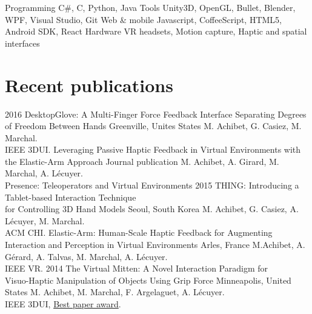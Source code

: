 \documentclass[]{friggeri-cv}
\begin{document}
\begin{entrylist}
	\entry
		{Programming}
		{C\#, C, Python, Java}
		{}
		{}
	\entry
		{Tools}
		{Unity3D, OpenGL, Bullet, Blender, WPF, Visual Studio, Git}
		{}
		{}
	\entry
		{Web \& mobile}
		{Javascript, CoffeeScript, HTML5, Android SDK, React}
		{}
		{}
	\entry
		{Hardware}
		{VR headsets, Motion capture, Haptic and spatial interfaces}
		{}
		{}
\end{entrylist}

\section{Recent publications}

\begin{entrylist}
  \entry
    {2016}
    {DesktopGlove: A Multi-Finger Force Feedback Interface Separating Degrees of Freedom Between Hands}
    {Greenville, Unites States}
    {M. Achibet, G. Casiez, M. Marchal.\\ IEEE 3DUI.}
  \entry
    {}
    {Leveraging Passive Haptic Feedback in Virtual Environments with the Elastic-Arm Approach}
    {Journal publication}
    {M. Achibet, A. Girard, M. Marchal, A. Lécuyer.\\Presence: Teleoperators and Virtual Environments}
  \entry
    {2015}
    {THING: Introducing a Tablet-based Interaction Technique\\ for Controlling 3D Hand Models}
    {Seoul, South Korea}
    {M. Achibet, G. Casiez, A. Lécuyer, M. Marchal.\\ACM CHI.}
  \entry
    {}
    {Elastic-Arm: Human-Scale Haptic Feedback for Augmenting\\ Interaction and Perception in Virtual Environments}
    {Arles, France}
    {M.Achibet, A. Gérard, A. Talvas, M. Marchal, A. Lécuyer.\\IEEE VR.}
  \entry
    {2014}
    {The Virtual Mitten: A Novel Interaction Paradigm for\\ Visuo-Haptic Manipulation of Objects Using Grip Force}
    {Minneapolis, United States}
    {M. Achibet, M. Marchal, F. Argelaguet, A. Lécuyer.\\IEEE 3DUI, \underline{Best paper award}.}
\end{entrylist}
\end{document}
